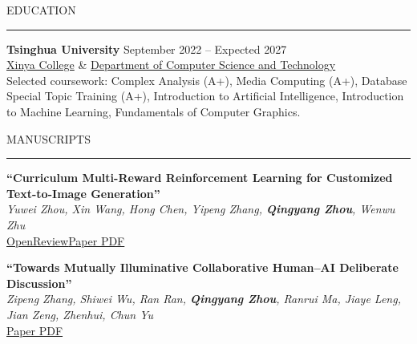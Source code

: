 \documentclass{resume} %
\renewenvironment{rSection}[1]{
\sectionskip
\textcolor{TsinghuaPurple}{\MakeUppercase{#1}}
\sectionlineskip
\hrule
\begin{list}{}{
\setlength{\leftmargin}{0em}
\setlength{\topsep}{4pt}
\setlength{\parsep}{0pt}
}
\item[]
}{
\end{list}
}
\begin{document}
  
\setlength{\parindent}{0pt}
\setlength{\parskip}{0pt}
\def\sectionskip{\vspace{8pt}}
\def\sectionlineskip{\vspace{1pt}}


\begin{rSection}{Education}

{\bf Tsinghua University} \hfill
{September 2022 -- Expected 2027}\\
\href{https://www.xyc.tsinghua.edu.cn/index.htm}{Xinya College} \& \href{https://www.cs.tsinghua.edu.cn/}{Department of Computer Science and Technology}
\\
Selected coursework: Complex Analysis (A+), Media Computing (A+), Database Special Topic Training (A+), Introduction to Artificial Intelligence, Introduction to Machine Learning, Fundamentals of Computer Graphics. %

\end{rSection} 

\begin{rSection}{Manuscripts} \itemsep -3pt
{\textbf{``Curriculum Multi-Reward Reinforcement Learning for Customized Text-to-Image Generation''}\\
 \textit{Yuwei Zhou, Xin Wang, Hong Chen, Yipeng Zhang, \textbf{Qingyang Zhou}, Wenwu Zhu}\\
 \href{https://openreview.net/pdf?id=kiGUqX6Gct}{OpenReview}\quad \href{https://esperarr.github.io/CV/assets/papers/Curriculum_Multi_Reward.pdf}{Paper PDF}}

 {\textbf{``Towards Mutually Illuminative Collaborative Human--AI Deliberate Discussion''}\\
 \textit{Zipeng Zhang, Shiwei Wu, Ran Ran, \textbf{Qingyang Zhou}, Ranrui Ma, Jiaye Leng, Jian Zeng, Zhenhui, Chun Yu}\\
 \href{https://esperarr.github.io/CV/assets/papers/Towards_Mutually_Illuminative_Collaborative_Human\%E2\%80\%93AI_Deliberate_Discussion.pdf}{Paper PDF}}
 
\end{rSection}
\end{document}

